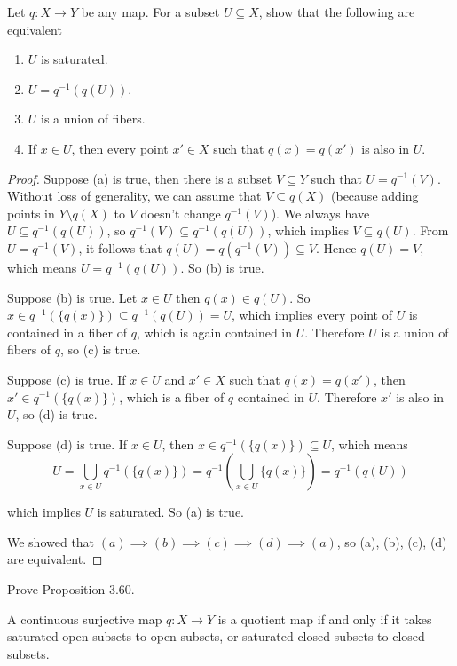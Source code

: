 \begin{exercise}{3.59}\label{exercise:3.59}
	Let $q: X\to Y$ be any map. For a subset $U\subseteq X$, show that the following are equivalent
	\begin{enumerate}[label={(\alph*)}]
		\item $U$ is saturated.
		\item $U = q^{-1}(q(U))$.
		\item $U$ is a union of fibers.
		\item If $x\in U$, then every point $x'\in X$ such that $q(x) = q(x')$ is also in $U$.
	\end{enumerate}
\end{exercise}

\begin{proof}
	Suppose (a) is true, then there is a subset $V\subseteq Y$ such that $U = q^{-1}(V)$. Without loss of generality, we can assume that $V\subseteq q(X)$ (because adding points in $Y\setminus q(X)$ to $V$ doesn't change $q^{-1}(V)$). We always have $U\subseteq q^{-1}(q(U))$, so $q^{-1}(V)\subseteq q^{-1}(q(U))$, which implies $V\subseteq q(U)$. From $U = q^{-1}(V)$, it follows that $q(U) = q(q^{-1}(V))\subseteq V$. Hence $q(U) = V$, which means $U = q^{-1}(q(U))$. So (b) is true.

	Suppose (b) is true. Let $x\in U$ then $q(x)\in q(U)$. So $x\in q^{-1}(\{ q(x) \})\subseteq q^{-1}(q(U)) = U$, which implies every point of $U$ is contained in a fiber of $q$, which is again contained in $U$. Therefore $U$ is a union of fibers of $q$, so (c) is true.

	Suppose (c) is true. If $x\in U$ and $x'\in X$ such that $q(x) = q(x')$, then $x'\in q^{-1}(\{q(x)\})$, which is a fiber of $q$ contained in $U$. Therefore $x'$ is also in $U$, so (d) is true.

	Suppose (d) is true. If $x\in U$, then $x\in q^{-1}(\{ q(x) \})\subseteq U$, which means
	\[
		U = \bigcup_{x\in U}q^{-1}(\{ q(x) \}) = q^{-1}\left(\bigcup_{x\in U}\{ q(x) \}\right) = q^{-1}(q(U))
	\]

	which implies $U$ is saturated. So (a) is true.

	We showed that $(a)\implies (b) \implies (c) \implies (d) \implies (a)$, so (a), (b), (c), (d) are equivalent.
\end{proof}

\begin{exercise}{3.61}\label{exercise:3.61}
	Prove Proposition 3.60.

	A continuous surjective map $q: X\to Y$ is a quotient map if and only if it takes saturated open subsets to open subsets, or saturated closed subsets to closed subsets.
\end{exercise}

